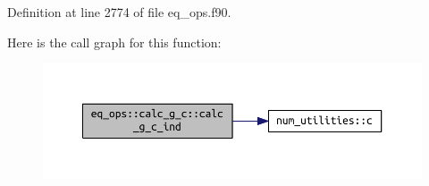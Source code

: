 Definition at line 2774 of file eq\+\_\+ops.\+f90.

Here is the call graph for this function\+:\nopagebreak
\begin{figure}[H]
\begin{center}
\leavevmode
\includegraphics[width=350pt]{interfaceeq__ops_1_1calc__g__c_a55dca52f3f82960703162dba425d358d_cgraph}
\end{center}
\end{figure}


